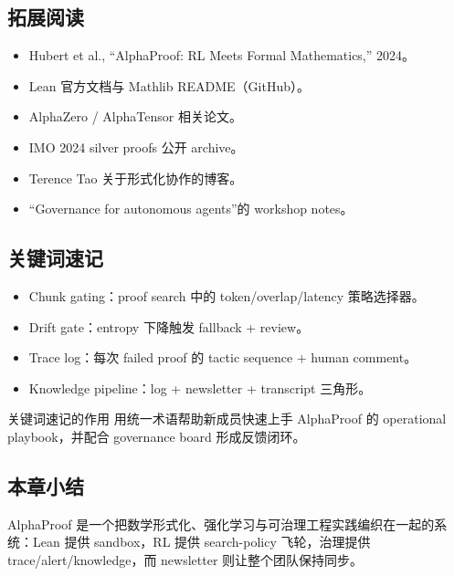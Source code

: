 \documentclass[a4paper]{article}
\begin{document}
\subsection{拓展阅读}
\begin{itemize}
    \item Hubert et al., ``AlphaProof: RL Meets Formal Mathematics,'' 2024。
    \item Lean 官方文档与 Mathlib README（GitHub）。
    \item AlphaZero / AlphaTensor 相关论文。
    \item IMO 2024 silver proofs 公开 archive。
    \item Terence Tao 关于形式化协作的博客。
    \item “Governance for autonomous agents”的 workshop notes。
\end{itemize}

\subsection{关键词速记}
\begin{itemize}
    \item Chunk gating：proof search 中的 token/overlap/latency 策略选择器。
    \item Drift gate：entropy 下降触发 fallback + review。
    \item Trace log：每次 failed proof 的 tactic sequence + human comment。
    \item Knowledge pipeline：log + newsletter + transcript 三角形。
\end{itemize}
\begin{knowledgebox}{关键词速记的作用}
用统一术语帮助新成员快速上手 AlphaProof 的 operational playbook，并配合 governance board 形成反馈闭环。
\end{knowledgebox}

\subsection{本章小结}
AlphaProof 是一个把数学形式化、强化学习与可治理工程实践编织在一起的系统：Lean 提供 sandbox，RL 提供 search-policy 飞轮，治理提供 trace/alert/knowledge，而 newsletter 则让整个团队保持同步。
\end{document}

